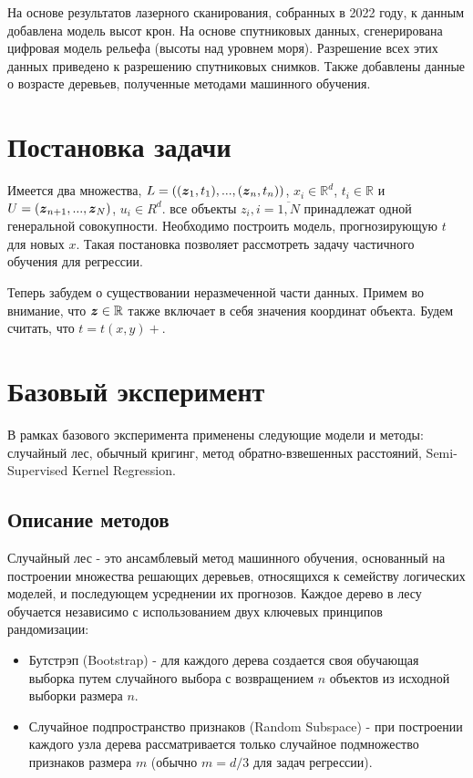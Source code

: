 \documentclass{article}
\def\vec#1{\mathchoice{\mbox{\boldmath$\displaystyle#1$}}
{\mbox{\boldmath$\textstyle#1$}} {\mbox{\boldmath$\scriptstyle#1$}} {\mbox{\boldmath$\scriptscriptstyle#1$}}}
\begin{document}
На основе результатов лазерного сканирования, собранных в 2022 году, к данным добавлена модель высот крон. На основе спутниковых данных, сгенерирована цифровая модель рельефа (высоты над уровнем моря). Разрешение всех этих данных приведено к разрешению спутниковых снимков. Также добавлены данные о возрасте деревьев, полученные методами машинного обучения.

\section{Постановка задачи}
Имеется два множества, $L = ((\vec{z}_1, t_1), ..., (\vec{z}_n, t_n))$, $x_i \in \mathbb{R}^{d}$, $t_i \in \mathbb{R}$ и $U = (\vec{z}_{n+1}, ..., \vec{z}_N)$, $u_i \in R^{d}$. все объекты $z_i, i=\overline{1, N}$ принадлежат одной генеральной совокупности. Необходимо построить модель, прогнозирующую $t$ для новых $x$. Такая постановка позволяет рассмотреть задачу частичного обучения для регрессии.

Теперь забудем о существовании неразмеченной части данных. Примем во внимание, что $\vec{z} \in \mathbb{R}$ также включает в себя значения координат объекта. Будем считать, что $t = t(x, y) + $. 




\section{Базовый эксперимент}
В рамках базового эксперимента применены следующие модели и методы: случайный лес, обычный кригинг, метод обратно-взвешенных расстояний, Semi-Supervised Kernel Regression.
\subsection{Описание методов}

Случайный лес - это ансамблевый метод машинного обучения, основанный на построении множества решающих деревьев, относящихся к семейству логических моделей, и последующем усреднении их прогнозов. Каждое дерево в лесу обучается независимо с использованием двух ключевых принципов рандомизации:
\begin{itemize}
    \item Бутстрэп (Bootstrap) - для каждого дерева создается своя обучающая выборка путем случайного выбора с возвращением $n$ объектов из исходной выборки размера $n$.
    \item Случайное подпространство признаков (Random Subspace) - при построении каждого узла дерева рассматривается только случайное подмножество признаков размера $m$ (обычно $m = d / 3$ для задач регрессии).
\end{itemize}
\end{document}
